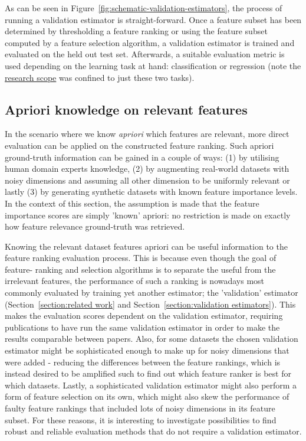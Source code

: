 \documentclass{article}
\begin{document}
As can be seen in Figure~\ref{fig:schematic-validation-estimators}, the process of running a validation estimator is straight-forward. Once a feature subset has been determined by thresholding a feature ranking or using the feature subset computed by a feature selection algorithm, a validation estimator is trained and evaluated on the held out test set. Afterwards, a suitable evaluation metric is used depending on the learning task at hand: classification or regression (note the \hyperref[section:introduction]{research scope} was confined to just these two tasks).

\subsection{Apriori knowledge on relevant features}
In the scenario where we know \textit{apriori} which features are relevant, more direct evaluation can be applied on the constructed feature ranking. Such apriori ground-truth information can be gained in a couple of ways: (1) by utilising human domain experts knowledge, (2) by augmenting real-world datasets with noisy dimensions and assuming all other dimension to be uniformly relevant or lastly (3) by generating synthetic datasets with known feature importance levels. In the context of this section, the assumption is made that the feature importance scores are simply 'known' apriori: no restriction is made on exactly how feature relevance ground-truth was retrieved.

Knowing the relevant dataset features apriori can be useful information to the feature ranking evaluation process. This is because even though the goal of feature- ranking and selection algorithms is to separate the useful from the irrelevant features, the performance of such a ranking is nowadays most commonly evaluated by training yet another estimator; the 'validation' estimator (Section~\ref{section:related work} and Section~\ref{section:validation estimators}). This makes the evaluation scores dependent on the validation estimator, requiring publications to have run the same validation estimator in order to make the results comparable between papers. Also, for some datasets the chosen validation estimator might be sophisticated enough to make up for noisy dimensions that were added - reducing the differences between the feature rankings, which is instead desired to be amplified such to find out which feature ranker is best for which datasets. Lastly, a sophisticated validation estimator might also perform a form of feature selection on its own, which might also skew the performance of faulty feature rankings that included lots of noisy dimensions in its feature subset. For these reasons, it is interesting to investigate possibilities to find robust and reliable evaluation methods that do not require a validation estimator.
\end{document}
